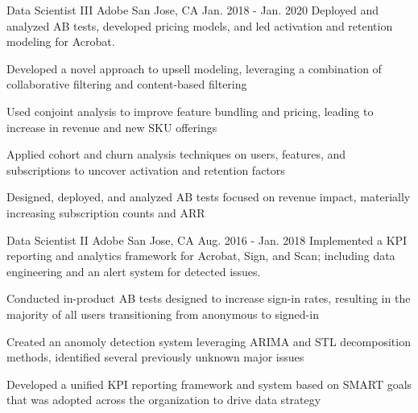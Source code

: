 \begin{cventries}
\cventry
    {Data Scientist III} %
    {Adobe} %
    {San Jose, CA} %
    {Jan. 2018 - Jan. 2020} %
    {Deployed and analyzed AB tests, developed pricing models, and led activation and retention modeling for Acrobat.} %
    {
      \begin{cvitems} %
        \item {Developed a novel approach to upsell modeling, leveraging a combination of collaborative filtering and content-based filtering}
        \item {Used conjoint analysis to improve feature bundling and pricing, leading to increase in revenue and new SKU offerings}
        \item {Applied cohort and churn analysis techniques on users, features, and subscriptions to uncover activation and retention factors}
        \item {Designed, deployed, and analyzed AB tests focused on revenue impact, materially increasing subscription counts and ARR}
      \end{cvitems}
    }

\cventry
    {Data Scientist II} %
    {Adobe} %
    {San Jose, CA} %
    {Aug. 2016 - Jan. 2018} %
    {Implemented a KPI reporting and analytics framework for Acrobat, Sign, and Scan; including data engineering and an alert system for detected issues.} %
    {
      \begin{cvitems} %
        \item {Conducted in-product AB tests designed to increase sign-in rates, resulting in the majority of all users transitioning from anonymous to signed-in}
        \item {Created an anomoly detection system leveraging ARIMA and STL decomposition methods, identified several previously unknown major issues}
        \item {Developed a unified KPI reporting framework and system based on SMART goals that was adopted across the organization to drive data strategy}
      \end{cvitems}
    }

\end{cventries}
